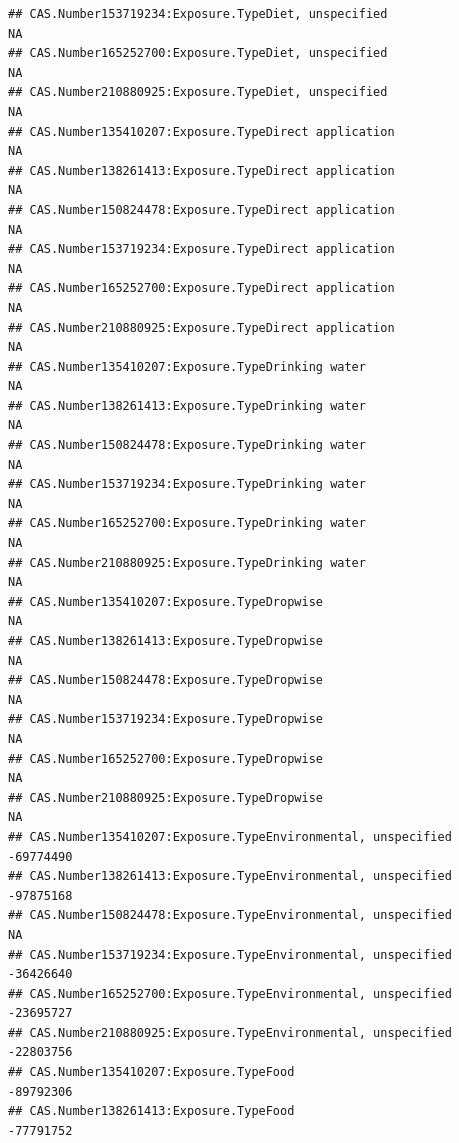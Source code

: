 \documentclass[
  12pt,
]{article}
\begin{document}
\begin{verbatim}
## CAS.Number153719234:Exposure.TypeDiet, unspecified                                  NA
## CAS.Number165252700:Exposure.TypeDiet, unspecified                                  NA
## CAS.Number210880925:Exposure.TypeDiet, unspecified                                  NA
## CAS.Number135410207:Exposure.TypeDirect application                                 NA
## CAS.Number138261413:Exposure.TypeDirect application                                 NA
## CAS.Number150824478:Exposure.TypeDirect application                                 NA
## CAS.Number153719234:Exposure.TypeDirect application                                 NA
## CAS.Number165252700:Exposure.TypeDirect application                                 NA
## CAS.Number210880925:Exposure.TypeDirect application                                 NA
## CAS.Number135410207:Exposure.TypeDrinking water                                     NA
## CAS.Number138261413:Exposure.TypeDrinking water                                     NA
## CAS.Number150824478:Exposure.TypeDrinking water                                     NA
## CAS.Number153719234:Exposure.TypeDrinking water                                     NA
## CAS.Number165252700:Exposure.TypeDrinking water                                     NA
## CAS.Number210880925:Exposure.TypeDrinking water                                     NA
## CAS.Number135410207:Exposure.TypeDropwise                                           NA
## CAS.Number138261413:Exposure.TypeDropwise                                           NA
## CAS.Number150824478:Exposure.TypeDropwise                                           NA
## CAS.Number153719234:Exposure.TypeDropwise                                           NA
## CAS.Number165252700:Exposure.TypeDropwise                                           NA
## CAS.Number210880925:Exposure.TypeDropwise                                           NA
## CAS.Number135410207:Exposure.TypeEnvironmental, unspecified                  -69774490
## CAS.Number138261413:Exposure.TypeEnvironmental, unspecified                  -97875168
## CAS.Number150824478:Exposure.TypeEnvironmental, unspecified                         NA
## CAS.Number153719234:Exposure.TypeEnvironmental, unspecified                  -36426640
## CAS.Number165252700:Exposure.TypeEnvironmental, unspecified                  -23695727
## CAS.Number210880925:Exposure.TypeEnvironmental, unspecified                  -22803756
## CAS.Number135410207:Exposure.TypeFood                                        -89792306
## CAS.Number138261413:Exposure.TypeFood                                        -77791752

\end{verbatim}
\end{document}
